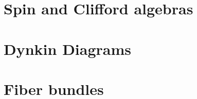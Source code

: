 \documentclass{article}
\begin{document}
\tableofcontents

\section{Spin and Clifford algebras}


\section{Dynkin Diagrams}

\section{Fiber bundles}
\end{document}
